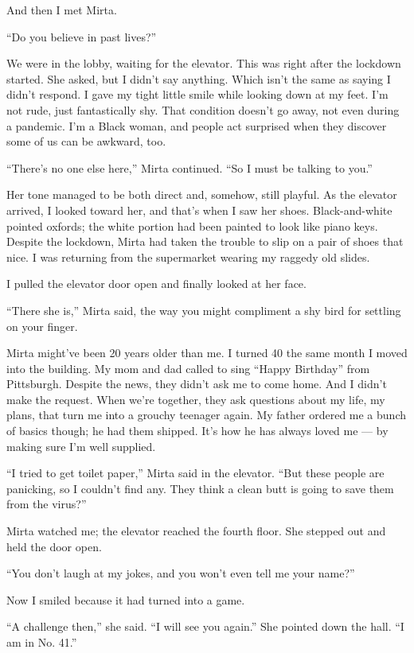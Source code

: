 And then I met Mirta.

``Do you believe in past lives?''

We were in the lobby, waiting for the elevator. This was right after the
lockdown started. She asked, but I didn't say anything. Which isn't the
same as saying I didn't respond. I gave my tight little smile while
looking down at my feet. I'm not rude, just fantastically shy. That
condition doesn't go away, not even during a pandemic. I'm a Black
woman, and people act surprised when they discover some of us can be
awkward, too.

``There's no one else here,'' Mirta continued. ``So I must be talking to
you.''

Her tone managed to be both direct and, somehow, still playful. As the
elevator arrived, I looked toward her, and that's when I saw her shoes.
Black-and-white pointed oxfords; the white portion had been painted to
look like piano keys. Despite the lockdown, Mirta had taken the trouble
to slip on a pair of shoes that nice. I was returning from the
supermarket wearing my raggedy old slides.

I pulled the elevator door open and finally looked at her face.

``There she is,'' Mirta said, the way you might compliment a shy bird
for settling on your finger.

Mirta might've been 20 years older than me. I turned 40 the same month I
moved into the building. My mom and dad called to sing ``Happy
Birthday'' from Pittsburgh. Despite the news, they didn't ask me to come
home. And I didn't make the request. When we're together, they ask
questions about my life, my plans, that turn me into a grouchy teenager
again. My father ordered me a bunch of basics though; he had them
shipped. It's how he has always loved me --- by making sure I'm well
supplied.

``I tried to get toilet paper,'' Mirta said in the elevator. ``But these
people are panicking, so I couldn't find any. They think a clean butt is
going to save them from the virus?''

Mirta watched me; the elevator reached the fourth floor. She stepped out
and held the door open.

``You don't laugh at my jokes, and you won't even tell me your name?''

Now I smiled because it had turned into a game.

``A challenge then,'' she said. ``I will see you again.'' She pointed
down the hall. ``I am in No. 41.''

